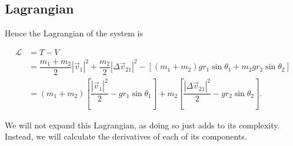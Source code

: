 \documentclass[12pt,a4paper,portrait]{article}
\newcommand{\lag}{\mathcal{L}}
\begin{document}
\begin{landscape}
\subsection{Lagrangian}
Hence the Lagrangian of the system is

\begin{align*}
	\lag &= T - V \\
	&= \dfrac{m_1+m_2}{2}|\vec{v}_1|^2 + \dfrac{m_2}{2}|\Delta \vec{v}_{21}|^2 - \left[(m_1+m_2)gr_1\sin{\theta_1} + m_2gr_2\sin{\theta_2}\right] \\
	&= (m_1+m_2)\left[\dfrac{|\vec{v}_1|^2}{2} - gr_1\sin{\theta_1}\right] + m_2\left[\dfrac{|\Delta \vec{v}_{21}|^2}{2} - gr_2\sin{\theta_2}\right].
\end{align*}

We will not expand this Lagrangian, as doing so just adds to its complexity. Instead, we will calculate the derivatives of each of its components. 


\end{landscape}
\end{document}
